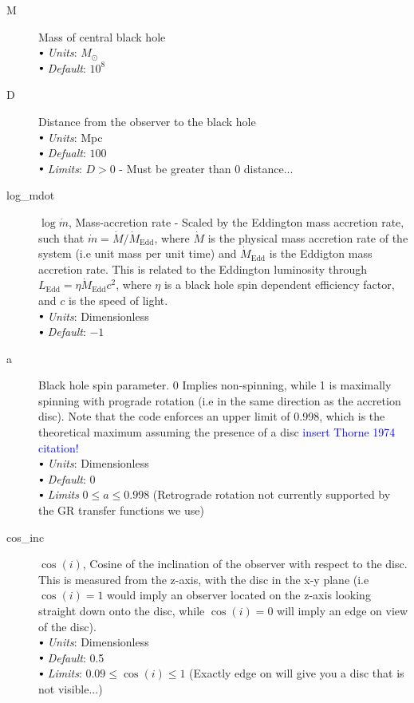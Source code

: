 \documentclass[a4paper, 11pt, times, onecolumn]{article}
\newcommand{\Msol}{M_{\odot}}
\newcommand{\mdot}{\dot{m}}
\newcommand{\Mdot}{\dot{M}}
\newcommand{\Mdedd}{\dot{M}_{\mathrm{Edd}}}
\newcommand{\Ledd}{L_{\mathrm{Edd}}}
\newcommand{\sbt}{\,\begin{picture}(-1,1)(-1,-3)\circle*{3}\end{picture}\ }
\begin{document}
\begin{description}
	\item[M] Mass of central black hole \\
		$\sbt$ {\it Units}: $\Msol$ \\
		$\sbt$ {\it Default}: $10^{8}$ \\

	
	\item[D]  Distance from the observer to the black hole \\
		$\sbt$ {\it Units}: Mpc \\
		$\sbt$ {\it Defualt}: $100$ \\
		$\sbt$ {\it Limits}: $D>0$ - Must be greater than 0 distance...
	
	\item[log\_mdot] $\log \mdot$, Mass-accretion rate - Scaled by the Eddington mass accretion rate, such that $\mdot = \Mdot/\Mdedd$, where $\Mdot$ is the physical mass accretion rate of the system (i.e unit mass per unit time) and $\Mdedd$ is the Eddigton mass accretion rate. This is related to the Eddington luminosity through $\Ledd = \eta \Mdedd c^{2}$, where $\eta$ is a black hole spin dependent efficiency factor, and $c$ is the speed of light. \\
		$\sbt$ {\it Units}: Dimensionless \\
		$\sbt$ {\it Default}: $-1$ \\
	
	\item[a] Black hole spin parameter. 0 Implies non-spinning, while 1 is maximally spinning with prograde rotation (i.e in the same direction as the accretion disc). Note that the code enforces an upper limit of 0.998, which is the theoretical maximum assuming the presence of a disc \textcolor{blue}{insert Thorne 1974 citation!} \\
		$\sbt$ {\it Units}: Dimensionless \\
		$\sbt$ {\it Default}: $0$ \\
		$\sbt$ {\it Limits} $0 \leq a \leq 0.998$ (Retrograde rotation not currently supported by the GR transfer functions we use)
	
	\item[cos\_inc]  $\cos(i)$, Cosine of the inclination of the observer with respect to the disc. This is measured from the z-axis, with the disc in the x-y plane (i.e $\cos(i) = 1$ would imply an observer located on the z-axis looking straight down onto the disc, while $\cos(i) = 0$ will imply an edge on view of the disc). \\
		$\sbt$ {\it Units}: Dimensionless \\
		$\sbt$ {\it Default}: 0.5 \\
		$\sbt$ {\it Limits}: $0.09 \leq \cos(i) \leq 1$ (Exactly edge on will give you a disc that is not visible...) 
	

\end{description}
\end{document}
